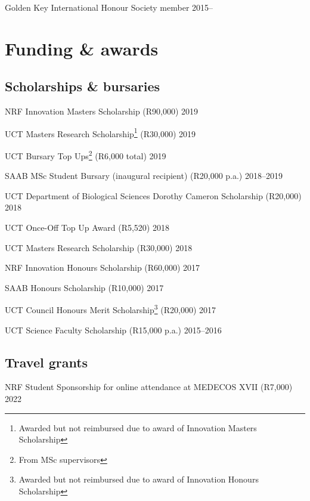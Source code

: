 \documentclass[10pt]{article}
\begin{document}
Golden Key International Honour Society member                     \hfill 2015--
\clearpage %

\section*{Funding \& awards} %

\subsection*{Scholarships \& bursaries}

NRF Innovation Masters Scholarship (R90,000)                         \hfill 2019

UCT Masters Research Scholarship\footnote{Awarded but not reimbursed
  due to award of Innovation Masters Scholarship} (R30,000)          \hfill 2019

UCT Bursary Top Ups\footnote{From MSc supervisors} (R6,000 total)    \hfill 2019

SAAB MSc Student Bursary (inaugural recipient) (R20,000 p.a.)  \hfill 2018--2019

UCT Department of Biological Sciences Dorothy Cameron Scholarship
  (R20,000)                                                          \hfill 2018

UCT Once-Off Top Up Award (R5,520)                                   \hfill 2018

UCT Masters Research Scholarship (R30,000)                           \hfill 2018

NRF Innovation Honours Scholarship (R60,000)                         \hfill 2017

SAAB Honours Scholarship (R10,000)                                   \hfill 2017

UCT Council Honours Merit Scholarship\footnote{Awarded but not
  reimbursed due to award of Innovation Honours Scholarship}
  (R20,000)                                                          \hfill 2017

UCT Science Faculty Scholarship (R15,000 p.a.)                 \hfill 2015--2016

\subsection*{Travel grants}

NRF Student Sponsorship for online attendance at MEDECOS XVII
  (R7,000)                                                           \hfill 2022
\end{document}
